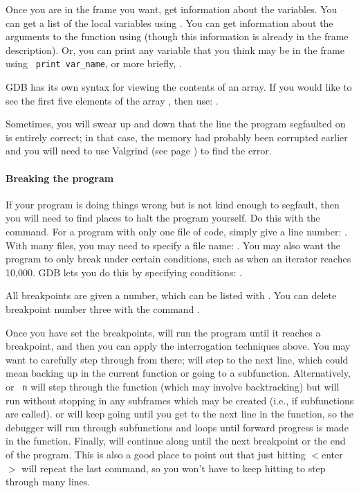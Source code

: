 \documentclass[12pt]{article}
\begin{document}
Once you are in the frame you want, get information about the variables. You can
get a list of the local variables using . You can get
information about the arguments to the function using 
(though this information is already in the frame description). Or, you
can print any variable that you think may be in the frame using {\tt
print var\_name}, or more briefly, . 

GDB has its own syntax for viewing the contents of an array. If you
would
like to see the first five elements of the array , then use:
.

Sometimes, you will swear up and down that the line the program segfaulted on is
entirely correct; in that case, the memory had probably been corrupted earlier and
you will need to use Valgrind (see page \pageref{valgrind}) to find the error.

\paragraph{Breaking the program} If your program is doing things wrong but is not kind
enough to segfault, then you will need to find places to halt the program
yourself. Do this with the  command. For a program with only
one file of code, simply give a line number: . With many
files, you may need to specify a file name: . You
may also want the program to only break under certain conditions, such
as when an iterator reaches 10,000. GDB lets you do this by specifying
conditions: .

All breakpoints are given a number, which can be listed with
. You can delete breakpoint number three with
the command .

Once you have set the breakpoints,  will run the program until it
reaches a breakpoint, and then you can apply the interrogation techniques
above. You may want to carefully step through from there; 
will step to the next line, which could mean backing up in the current
function or going to a subfunction. Alternatively,  or {\tt
n} will step through the function (which may involve backtracking) but
will run without stopping in any subframes which may be created
(i.e., if subfunctions are called).   or  will keep
going until you get to the next line in the function, so the debugger
will run through subfunctions and loops until forward progress is made
in the function.  Finally,  will continue along until the next
breakpoint or the end of the program. This is also a good place to
point out that just hitting $<$enter$>$ will repeat the last command,
so you won't have to keep hitting  to step through many lines.
\end{document}
